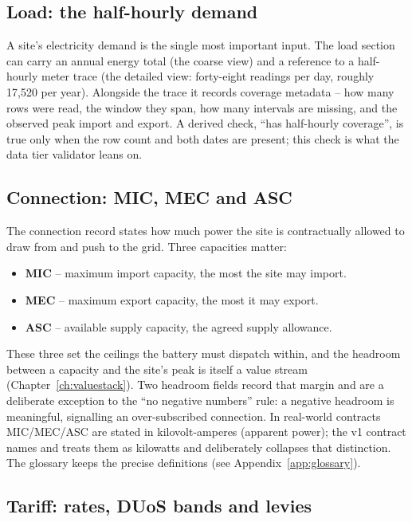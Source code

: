 \subsection{Load: the half-hourly demand}

A site's electricity demand is the single most important input. The load section can carry an annual energy total (the coarse view) and a reference to a half-hourly meter trace (the detailed view: forty-eight readings per day, roughly 17{,}520 per year). Alongside the trace it records coverage metadata -- how many rows were read, the window they span, how many intervals are missing, and the observed peak import and export. A derived check, ``has half-hourly coverage'', is true only when the row count and both dates are present; this check is what the data tier validator leans on.

\subsection{Connection: MIC, MEC and ASC}

The connection record states how much power the site is contractually allowed to draw from and push to the grid. Three capacities matter:

\begin{itemize}
  \item \textbf{MIC} -- maximum import capacity, the most the site may import.
  \item \textbf{MEC} -- maximum export capacity, the most it may export.
  \item \textbf{ASC} -- available supply capacity, the agreed supply allowance.
\end{itemize}

These three set the ceilings the battery must dispatch within, and the headroom between a capacity and the site's peak is itself a value stream (Chapter~\ref{ch:valuestack}). Two headroom fields record that margin and are a deliberate exception to the ``no negative numbers'' rule: a negative headroom is meaningful, signalling an over-subscribed connection. In real-world contracts MIC/MEC/ASC are stated in kilovolt-amperes (apparent power); the v1 contract names and treats them as kilowatts and deliberately collapses that distinction. The glossary keeps the precise definitions (see Appendix~\ref{app:glossary}).

\subsection{Tariff: rates, DUoS bands and levies}

